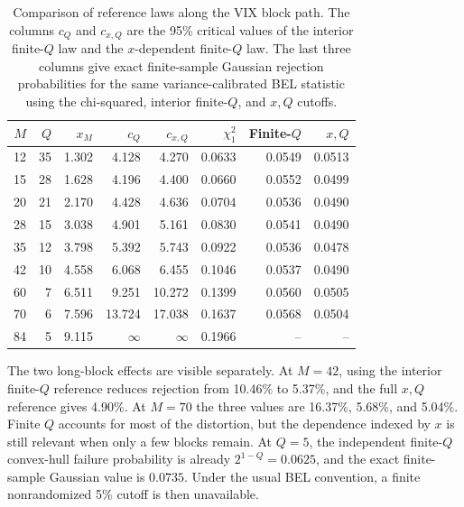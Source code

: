 \documentclass[12pt]{article}
\theoremstyle{remark}
\begin{document}
\begin{table}[htbp]
\centering
\caption{Comparison of reference laws along the VIX block path. The columns $c_Q$ and $c_{x,Q}$ are the 95\% critical values of the interior finite-$Q$ law and the $x$-dependent finite-$Q$ law. The last three columns give exact finite-sample Gaussian rejection probabilities for the same variance-calibrated BEL statistic using the chi-squared, interior finite-$Q$, and $x,Q$ cutoffs.}
\label{tab:supp-vix-boundary-compact}
\scriptsize
\setlength{\tabcolsep}{3.0pt}
\begin{tabular}{rrrrrrrr}
\toprule
$M$ & $Q$ & $x_M$ & $c_Q$ & $c_{x,Q}$ & $\chi_1^2$ & Finite-$Q$ & $x,Q$ \\
\midrule
12 & 35 & 1.302 & 4.128 & 4.270 & 0.0633 & 0.0549 & 0.0513 \\
15 & 28 & 1.628 & 4.196 & 4.400 & 0.0660 & 0.0552 & 0.0499 \\
20 & 21 & 2.170 & 4.428 & 4.636 & 0.0704 & 0.0536 & 0.0490 \\
28 & 15 & 3.038 & 4.901 & 5.161 & 0.0830 & 0.0541 & 0.0490 \\
35 & 12 & 3.798 & 5.392 & 5.743 & 0.0922 & 0.0536 & 0.0478 \\
42 & 10 & 4.558 & 6.068 & 6.455 & 0.1046 & 0.0537 & 0.0490 \\
60 & 7  & 6.511 & 9.251 & 10.272 & 0.1399 & 0.0560 & 0.0505 \\
70 & 6  & 7.596 & 13.724 & 17.038 & 0.1637 & 0.0568 & 0.0504 \\
84 & 5  & 9.115 & $\infty$ & $\infty$ & 0.1966 & -- & -- \\
\bottomrule
\end{tabular}
\end{table}

The two long-block effects are visible separately. At $M=42$, using the interior finite-$Q$ reference reduces rejection from 10.46\% to 5.37\%, and the full $x,Q$ reference gives 4.90\%. At $M=70$ the three values are 16.37\%, 5.68\%, and 5.04\%. Finite $Q$ accounts for most of the distortion, but the dependence indexed by $x$ is still relevant when only a few blocks remain. At $Q=5$, the independent finite-$Q$ convex-hull failure probability is already $2^{1-Q}=0.0625$, and the exact finite-sample Gaussian value is $0.0735$. Under the usual BEL convention, a finite nonrandomized 5\% cutoff is then unavailable.
\end{document}
